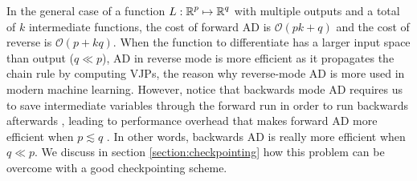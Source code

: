 In the general case of a function $L : \operatorname{\mathbb{R}}^p \mapsto \operatorname{\mathbb{R}}^q$ with multiple outputs and a total of $k$ intermediate functions, the cost of forward AD is $\mathcal O (pk + q)$ and the cost of reverse is $\mathcal O (p + kq)$.
When the function to differentiate has a larger input space than output ($q \ll p$), AD in reverse mode is more efficient as it propagates the chain rule by computing VJPs, the reason why reverse-mode AD is more used in modern machine learning.
However, notice that backwards mode AD requires us to save intermediate variables through the forward run in order to run backwards afterwards \cite{Bennett_1973}, leading to performance overhead that makes forward AD more efficient when $p \lesssim q$ \cite{Griewank_1989, Margossian_2018, Baydin_Pearlmutter_Radul_Siskind_2015}.  
In other words, backwards AD is really more efficient when $q \ll p$. 
We discuss in section \ref{section:checkpointing} how this problem can be overcome with a good checkpointing scheme. 


